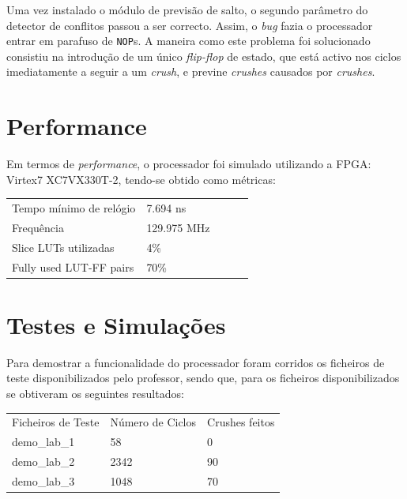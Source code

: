 \documentclass[a4paper]{article}
\begin{document}
	Uma vez instalado o módulo de previsão de salto, o segundo parâmetro do detector de conflitos passou a ser correcto. Assim, o \textit{bug} fazia o processador entrar em parafuso de \texttt{NOP}s. A maneira como este problema foi solucionado consistiu na introdução de um único \textit{flip-flop} de estado, que está activo nos ciclos imediatamente a seguir a um \textit{crush}, e previne \textit{crushes} causados por \textit{crushes}.
		
	\section{Performance}
	
	Em termos de \textit{performance}, o processador foi simulado utilizando a FPGA: Virtex7 XC7VX330T-2, tendo-se obtido como métricas:
	
	\begin{table}[h]
		\centering
		\begin{tabular}{lllll}
			Tempo mínimo de relógio & 7.694 ns  \\
			Frequência &  129.975 MHz\\
			Slice LUTs utilizadas &  4\%\\
			Fully used LUT-FF pairs & 70\%\\
			
		\end{tabular}
	\end{table}
	  
	
	
	\section{Testes e Simulações} 
		
	Para demostrar a funcionalidade do processador foram corridos os ficheiros de teste disponibilizados pelo professor, sendo que, para os ficheiros disponibilizados se obtiveram os seguintes resultados:
	
	\begin{table}[h]
		\centering
		\begin{tabular}{lllll}
			Ficheiros de Teste & Número de Ciclos & \multicolumn{3}{l}{Crushes feitos} \\
			demo\_lab\_1 & 58 & 0 \\
			demo\_lab\_2 & 2342 & 90 \\
			demo\_lab\_3 & 1048 & 70
		\end{tabular}
	\end{table}
	
\end{document}
